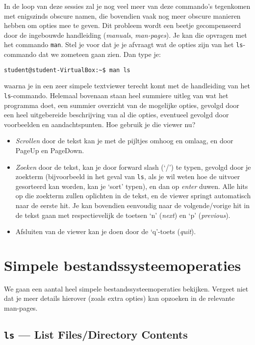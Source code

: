 \documentclass[a4paper,twoside,openany]{memoir}
\begin{document}
In de loop van deze sessies zal je nog veel meer van deze commando's tegenkomen met enigszinds obscure namen, die bovendien vaak nog meer obscure manieren hebben om opties mee te geven. Dit probleem wordt een beetje gecompenseerd door de ingebouwde handleiding (\emph{manuals}, \emph{man-pages}). Je kan die opvragen met het commando \verb!man!. Stel je voor dat je je afvraagt wat de opties zijn van het \verb!ls!-commando dat we zometeen gaan zien. Dan type je:
\begin{verbatim}
student@student-VirtualBox:~$ man ls
\end{verbatim}
waarna je in een zeer simpele textviewer terecht komt met de handleiding van het \verb!ls!-commando. Helemaal bovenaan staan heel summiere uitleg van wat het programma doet, een summier overzicht van de mogelijke opties, gevolgd door een heel uitgebereide beschrijving van al die opties, eventueel gevolgd door voorbeelden en aandachtspunten. Hoe gebruik je die viewer nu?
\begin{itemize}
\item \emph{Scrollen} door de tekst kan je met de pijltjes omhoog en omlaag, en door PageUp en PageDown.
\item \emph{Zoeken} door de tekst, kan je door forward slash (`/') te typen, gevolgd door je zoekterm (bijvoorbeeld in het geval van \verb!ls!, als je wil weten hoe de uitvoer gesorteerd kan worden, kan je `sort' typen), en dan op \emph{enter} duwen. Alle hits op die zoekterm zullen oplichten in de tekst, en de viewer springt automatisch naar de eerste hit. Je kan bovendien eenvoudig naar de volgende/vorige hit in de tekst gaan met respectievelijk de toetsen `n' (\emph{next}) en `p' (\emph{previous}).
\item {Afsluiten} van de viewer kan je doen door de `q'-toets (\emph{quit}).
\end{itemize}

\chapter{Simpele bestandssysteemoperaties}

We gaan een aantal heel simpele bestandssysteemoperaties bekijken. Vergeet niet dat je meer details hierover (zoals extra opties) kan opzoeken in de relevante man-pages.

\section{\texttt{ls} --- List Files/Directory Contents}
\end{document}
